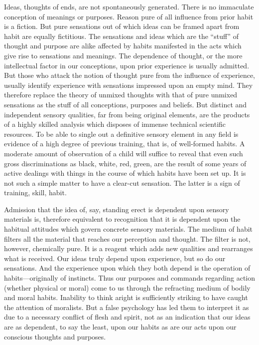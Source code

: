 \documentclass[12pt]{article}
\begin{document}
Ideas, thoughts of ends, are not spontaneously generated.
There is no immaculate conception of meanings
or purposes. Reason pure of all influence from
prior habit is a fiction. But pure sensations out of
which ideas can be framed apart from habit are equally
fictitious. The sensations and ideas which are the
``stuff'' of thought and purpose are alike affected by
habits manifested in the acts which give rise to sensations
and meanings. The dependence of thought, or
the more intellectual factor in our conceptions, upon
prior experience is usually admitted. But those who
attack the notion of thought pure from the influence
of experience, usually identify experience with sensations
impressed upon an empty mind. They therefore
replace the theory of unmixed thoughts with that of
pure unmixed sensations as the stuff of all conceptions,
purposes and beliefs. But distinct and independent
sensory qualities, far from being original elements, are
the products of a highly skilled analysis which disposes
of immense technical scientific resources. To be able to
single out a definitive sensory element in any field is
evidence of a high degree of previous training, that is,
of well-formed habits. A moderate amount of observation
of a child will suffice to reveal that even such gross
discriminations as black, white, red, green, are the result
of some years of active dealings with things in the
course of which habits have been set up. It is not such
a simple matter to have a clear-cut sensation. The
latter is a sign of training, skill, habit.

Admission that the idea of, say, standing erect is
dependent upon sensory materials is, therefore equivalent
to recognition that it is dependent upon the
habitual attitudes which govern concrete sensory materials.
The medium of habit filters all the material
that reaches our perception and thought. The filter is
not, however, chemically pure. It is a reagent which
adds new qualities and rearranges what is received.
Our ideas truly depend upon experience, but so do our
sensations. And the experience upon which they both
depend is the operation of habits---originally of instincts.
Thus our purposes and commands regarding
action (whether physical or moral) come to us through
the refracting medium of bodily and moral habits. Inability
to think aright is sufficiently striking to have
caught the attention of moralists. But a false psychology
has led them to interpret it as due to a necessary
conflict of flesh and spirit, not as an indication
that our ideas are as dependent, to say the least, upon
our habits as are our acts upon our conscious thoughts
and purposes.
\end{document}
